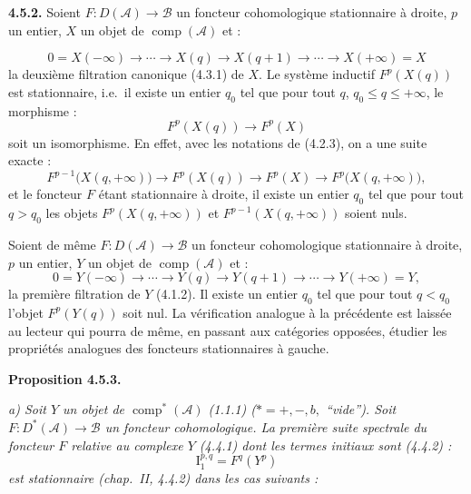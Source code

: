 \clearpage
{}%
\begingroup\small\setlength{\parskip}{0pt}\setlength{\emergencystretch}{1.5em}
\setlength{\abovedisplayskip}{4pt plus 2pt minus 2pt}%
\setlength{\belowdisplayskip}{4pt plus 2pt minus 2pt}%

\noindent\textbf{4.5.2.}\quad
Soient $F\colon D(\mathcal A)\longrightarrow\mathcal B$ un foncteur
cohomologique stationnaire à droite, $p$ un entier, $X$ un objet de
$\operatorname{comp}(\mathcal A)$ et :

\[
0=X(-\infty)\longrightarrow\cdots\longrightarrow X(q)
\longrightarrow X(q+1)\longrightarrow\cdots
\longrightarrow X(+\infty)=X
\]
la deuxième filtration canonique (4.3.1) de $X$. Le système inductif
$F^p(X(q))$ est stationnaire, i.e.\ il existe un entier $q_0$ tel que pour
tout $q$, $q_0\leq q\leq+\infty$, le morphisme :
\[
F^p(X(q))\longrightarrow F^p(X)
\]
soit un isomorphisme. En effet, avec les notations de (4.2.3), on a une
suite exacte :
\[
F^{p-1}\bigl(X(q,+\infty)\bigr)\longrightarrow F^p(X(q))
\longrightarrow F^p(X)\longrightarrow F^p\bigl(X(q,+\infty)\bigr),
\]
et le foncteur $F$ étant stationnaire à droite, il existe un entier $q_0$
tel que pour tout $q>q_0$ les objets $F^p(X(q,+\infty))$ et
$F^{p-1}(X(q,+\infty))$ soient nuls.

Soient de même $F\colon D(\mathcal A)\longrightarrow\mathcal B$ un
foncteur cohomologique stationnaire à droite, $p$ un entier, $Y$ un objet de
$\operatorname{comp}(\mathcal A)$ et :
\[
0=Y(-\infty)\longrightarrow\cdots\longrightarrow Y(q)
\longrightarrow Y(q+1)\longrightarrow\cdots
\longrightarrow Y(+\infty)=Y,
\]
la première filtration de $Y$ (4.1.2). Il existe un entier $q_0$ tel que
pour tout $q<q_0$ l'objet $F^p(Y(q))$ soit nul. La vérification analogue à
la précédente est laissée au lecteur qui pourra de même, en passant aux
catégories opposées, étudier les propriétés analogues des foncteurs
stationnaires à gauche.

\medskip\noindent\textbf{Proposition 4.5.3.}\quad

\noindent\textit{a) Soit $Y$ un objet de
$\operatorname{comp}^{*}(\mathcal A)$ (1.1.1)
($*=+,-,b,{}$ ``vide''). Soit
$F\colon D^*(\mathcal A)\longrightarrow\mathcal B$ un foncteur
cohomologique. La première suite spectrale du foncteur $F$ relative au
complexe $Y$ (4.4.1) dont les termes initiaux sont (4.4.2) :}
\[
\textit{$\mathrm{I}_1^{p,q}=F^q(Y^p)$}
\]
\textit{est stationnaire (chap.~II, 4.4.2) dans les cas suivants :}

